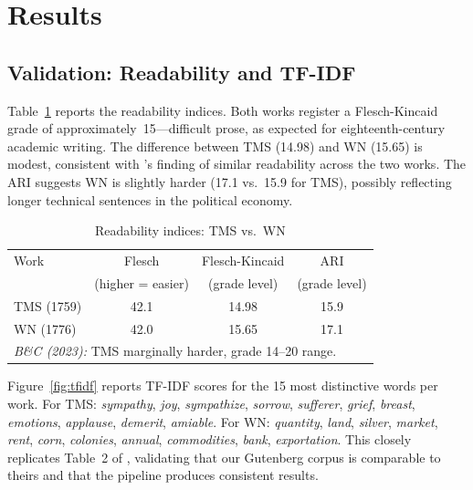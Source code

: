 \documentclass[12pt,a4paper]{article}
\begin{document}
\section{Results}

\subsection{Validation: Readability and TF-IDF}

Table~\ref{tab:readability} reports the readability indices.
Both works register a Flesch-Kincaid grade of approximately~15---difficult
prose, as expected for eighteenth-century academic writing.
The difference between TMS (14.98) and WN (15.65) is modest, consistent
with \citeauthor{Ballandonne2023}'s finding of similar readability
across the two works.
The ARI suggests WN is slightly harder (17.1 vs.\ 15.9 for TMS), possibly
reflecting longer technical sentences in the political economy.

\begin{table}[H]
\centering
\caption{Readability indices: TMS vs.\ WN}
\label{tab:readability}
\small
\begin{tabular}{lccc}
\toprule
Work & Flesch & Flesch-Kincaid & ARI \\
     & \small(higher = easier) & \small(grade level) & \small(grade level) \\
\midrule
TMS (1759) & 42.1 & 14.98 & 15.9 \\
WN  (1776) & 42.0 & 15.65 & 17.1 \\
\midrule
\multicolumn{4}{l}{\small \textit{B\&C (2023):} TMS marginally harder, grade 14--20 range.} \\
\bottomrule
\end{tabular}
\end{table}

Figure~\ref{fig:tfidf} reports TF-IDF scores for the 15 most distinctive
words per work.
For TMS: \textit{sympathy}, \textit{joy}, \textit{sympathize},
\textit{sorrow}, \textit{sufferer}, \textit{grief}, \textit{breast},
\textit{emotions}, \textit{applause}, \textit{demerit}, \textit{amiable}.
For WN: \textit{quantity}, \textit{land}, \textit{silver},
\textit{market}, \textit{rent}, \textit{corn}, \textit{colonies},
\textit{annual}, \textit{commodities}, \textit{bank},
\textit{exportation}.
This closely replicates Table~2 of \citet{Ballandonne2023}, validating
that our Gutenberg corpus is comparable to theirs and that the pipeline
produces consistent results.
\end{document}
